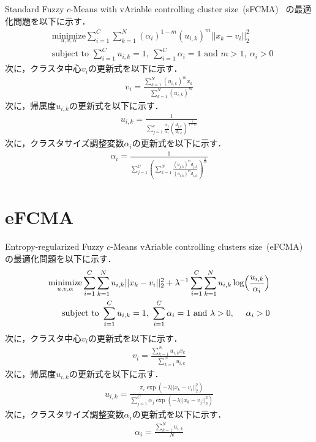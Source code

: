 \documentclass[a4j,12pt,dvipdfmx,oneside]{jsbook}
\theoremstyle{definition}
\begin{document}
 Standard Fuzzy $c$-Means with vAriable controlling cluster size~(sFCMA)~\cite{sFCMA}
 の最適化問題を以下に示す．
 \begin{align}
  &\underset{u,v,\alpha}{\text{minimize}}
  \sum_{i=1}^C\sum_{k=1}^N(\alpha_{i})^{1-m}(u_{i,k})^m||x_k-v_i||_2^2\\
  &{\text{subject to }}\sum_{i=1}^Cu_{i,k}=1,~\sum_{i=1}^C\alpha_{i}=1{\text{ and }}m>1,~\alpha_{i}>0
 \end{align}
 次に，クラスタ中心$v_{i}$の更新式を以下に示す．
 \begin{align}
  v_{i}=\frac{\sum_{k=1}^N(u_{i,k})^mx_{k}}{\quad\sum_{k=1}^N(u_{i,k})^{m}}
 \end{align}
 次に，帰属度$u_{i,k}$の更新式を以下に示す．
 \begin{align}
  u_{i,k}=\frac{1}{\sum_{j=1}^c\frac{\alpha_{j}}{\alpha_{i}}\left(\frac{d_{j,k}}{d_{i,k}}\right)^\frac{1}{1-m}}
 \end{align}
 次に，クラスタサイズ調整変数$\alpha_{i}$の更新式を以下に示す．
 \begin{align}
  \alpha_{i}=\frac{1}{\sum_{j=1}^C\left(\sum_{k=1}^N\frac{(u_{j,k})^md_{j,k}}{(u_{i,k})^md_{i,k}}\right)^{\frac{1}{m}}}
 \end{align}

 \section{eFCMA}\label{sec:efcma}

 Entropy-regularized Fuzzy $c$-Means vAriable controlling clusters size~(eFCMA)~\cite{eFCMA}
 の最適化問題を以下に示す．
 \begin{align}
  \underset{u,v,\alpha}{\text{minimize}}
  \sum_{i=1}^C\sum_{k=1}^Nu_{i,k}||x_k-v_i||_2^2+\lambda^{-1}\sum_{i=1}^C\sum_{k=1}^Nu_{i,k}\log\Bigl(\frac{u_{i,k}}{\alpha_{i}}\Bigl)\\
  {\text{subject to }}\sum_{i=1}^Cu_{i,k}=1,~\sum_{i=1}^C\alpha_{i}=1{\text{ and }}\lambda>0,~\quad\alpha_{i}>0
 \end{align}
 次に，クラスタ中心$v_{i}$の更新式を以下に示す．
 \begin{align}
  v_{i}=\frac{\sum_{k=1}^Nu_{i,k}x_{k}}{\quad\sum_{k=1}^Nu_{i,k}}
 \end{align}
 次に，帰属度$u_{i,k}$の更新式を以下に示す．
 \begin{align}
  u_{i,k}=\frac{\pi_{i}\exp(-\lambda||x_k-v_i||_2^2)}{\sum_{j=1}^C\alpha_{j}\exp(-\lambda||x_k-v_j||_2^2)}
 \end{align}
 次に，クラスタサイズ調整変数$\alpha_{i}$の更新式を以下に示す．
 \begin{align}
  \alpha_{i}=\frac{\sum_{k=1}^Nu_{i,k}}{\quad N}
 \end{align}
\end{document}
